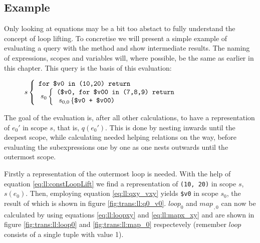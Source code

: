 \subsection{Example}
\label{sect:trans:ll:example}

Only looking at equations may be a bit too abstact to fully understand the concept of loop lifting. To
concretise we will present a simple example of evaluating a query with the method and show intermediate results.
The naming of expressions, scopes and variables will, where possible, be the same as earlier in this chapter. This
query is the basis of this evaluation:

\begin{figure*}[h!]
\centering
\begin{math}
s\left\{
\begin{array}{l}
\mbox{\texttt{for \$v0 in (10,20) return}} \\ \;
s_{0}\left\{
\begin{array}{l}
\mbox{\texttt{(\$v0, for \$v00 in (7,8,9) return}} \\ \;
s_{0,0}\left\{ \mbox{\texttt{\$v0 + \$v00)}}\right.
\end{array}
\right.
\end{array}
\right.
\end{math}
\end{figure*}

The goal of the evaluation is, after all other calculations, to have a representation of $e_{0}'$ in scope $s$,
that is, $q(e_{0}')$. This is done by nesting inwards until the deepest scope, while calculating needed helping
relations on the way, before evaluating the subexpressions one by one as one nests outwards until the outermost
scope.

Firstly a representation of the outermost loop is needed. With the help of equation \ref{eq:ll:constLoopLift} we
find a representation of \texttt{(10, 20)} in scope $s$, $s(e_{0})$. Then, employing equation \ref{eq:ll:qxy_vxy}
yields \texttt{\$v0} in scope $s_{0}$, the result of which is shown in figure \ref{fig:trans:ll:q0_v0}.
$loop_{0}$ and $map_{\, ,0}$ can now be calculated by using equations \ref{eq:ll:loopxy} and \ref{eq:ll:mapx_xy}
and are shown in figure \ref{fig:trans:ll:loop0} and \ref{fig:trans:ll:map_0} respectevely (remember
$loop$ consists of a single tuple with value 1).

